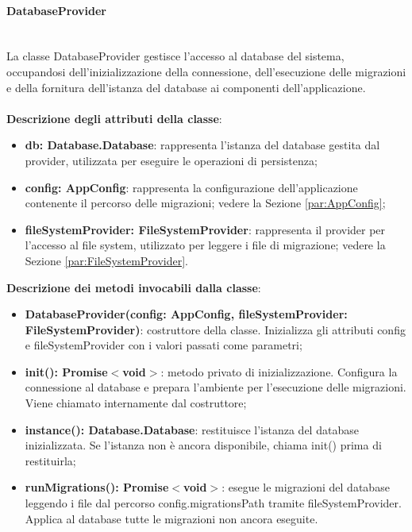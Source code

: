 \documentclass[a4paper,12pt]{article}
\begin{document}
{{{                \paragraph{DatabaseProvider}\label{par:DatabaseProvider}\mbox{}\\
                La classe DatabaseProvider gestisce l'accesso al database del sistema, occupandosi dell'inizializzazione della connessione, dell'esecuzione delle migrazioni e della fornitura dell'istanza del database ai componenti dell'applicazione.\\
                \\
                \textbf{Descrizione degli attributi della classe}:
                \begin{itemize}
                    \item \textbf{db: Database.Database}: rappresenta l'istanza del database gestita dal provider, utilizzata per eseguire le operazioni di persistenza;
                    \item \textbf{config: AppConfig}: rappresenta la configurazione dell'applicazione contenente il percorso delle migrazioni; vedere la Sezione \ref{par:AppConfig};
                    \item \textbf{fileSystemProvider: FileSystemProvider}: rappresenta il provider per l'accesso al file system, utilizzato per leggere i file di migrazione; vedere la Sezione \ref{par:FileSystemProvider}.
                \end{itemize}
                
                \noindent \textbf{Descrizione dei metodi invocabili dalla classe}:
                \begin{itemize}
                    \item \textbf{DatabaseProvider(config: AppConfig, fileSystemProvider: FileSystemProvider)}: costruttore della classe. Inizializza gli attributi config e fileSystemProvider con i valori passati come parametri;
                    \item \textbf{init(): Promise$<$void$>$}: metodo privato di inizializzazione. Configura la connessione al database e prepara l'ambiente per l'esecuzione delle migrazioni. Viene chiamato internamente dal costruttore;
                    \item \textbf{instance(): Database.Database}: restituisce l'istanza del database inizializzata. Se l'istanza non è ancora disponibile, chiama init() prima di restituirla;
                    \item \textbf{runMigrations(): Promise$<$void$>$}: esegue le migrazioni del database leggendo i file dal percorso config.migrationsPath tramite fileSystemProvider. Applica al database tutte le migrazioni non ancora eseguite.
                \end{itemize}
}}}
\end{document}
